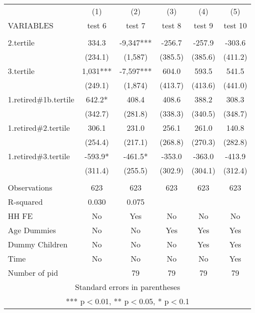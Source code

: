 \begin{tabular}{lccccc} \hline
 & (1) & (2) & (3) & (4) & (5) \\
VARIABLES & test 6 & test 7 & test 8 & test 9 & test 10 \\ \hline
 &  &  &  &  &  \\
2.tertile & 334.3 & -9,347*** & -256.7 & -257.9 & -303.6 \\
 & (234.1) & (1,587) & (385.5) & (385.6) & (411.2) \\
3.tertile & 1,031*** & -7,597*** & 604.0 & 593.5 & 541.5 \\
 & (249.1) & (1,874) & (413.7) & (413.6) & (441.0) \\
1.retired\#1b.tertile & 642.2* & 408.4 & 408.6 & 388.2 & 308.3 \\
 & (342.7) & (281.8) & (338.3) & (340.5) & (348.7) \\
1.retired\#2.tertile & 306.1 & 231.0 & 256.1 & 261.0 & 140.8 \\
 & (254.4) & (217.1) & (268.8) & (270.3) & (282.8) \\
1.retired\#3.tertile & -593.9* & -461.5* & -353.0 & -363.0 & -413.9 \\
 & (311.4) & (255.5) & (302.9) & (304.1) & (312.4) \\
 &  &  &  &  &  \\
Observations & 623 & 623 & 623 & 623 & 623 \\
R-squared & 0.030 & 0.075 &  &  &  \\
HH FE & No & Yes & No & No & No \\
Age Dummies & No & No & Yes & Yes & Yes \\
Dummy Children & No & No & No & Yes & Yes \\
Time & No & No & No & No & Yes \\
 Number of pid &  & 79 & 79 & 79 & 79 \\ \hline
\multicolumn{6}{c}{ Standard errors in parentheses} \\
\multicolumn{6}{c}{ *** p$<$0.01, ** p$<$0.05, * p$<$0.1} \\
\end{tabular}
